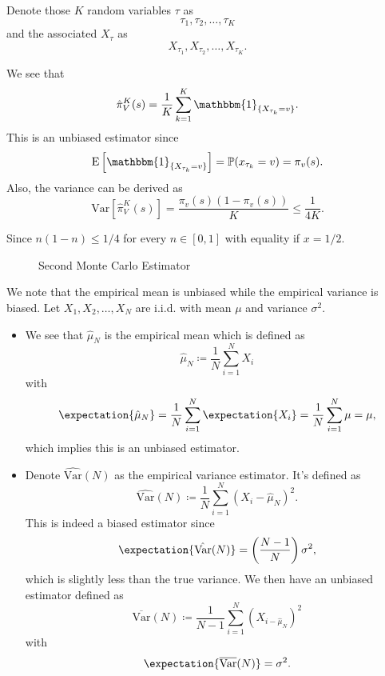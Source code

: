 Denote those \(K\) random variables \(\tau\) as
\[
	\tau_1, \tau_2, \ldots , \tau_K
\]
and the associated \(X_{\tau}\) as
\[
	X_{\tau_1}, X_{\tau_2}, \ldots , X_{\tau_K}.
\]

We see that
\[
	\hat{\pi}_V^K(s) = \frac{1}{K}\sum\limits_{k=1}^{K} \mathbbm{1}_{\{X_{\tau_k} = v\}}.
\]
This is an unbiased estimator since
\[
	\mathrm{E}\left[\mathbbm{1}_{\{X_{\tau_k}=v\}}\right] = \mathbb{\MakeUppercase{P}}(x_{\tau_k} = v) = \pi_v(s).
\]
Also, the variance can be derived as
\[
	\mathrm{Var} \left[ \hat{\pi}_V^K(s) \right] = \frac{\pi_v(s)(1 - \pi_v(s))}{K}\leq \frac{1}{4K}.
\]

\begin{remark}
	Since \(n(1-n)\leq 1/4\) for every \(n\in[0, 1]\) with equality if \(x = 1/2\).
\end{remark}

\begin{figure}[H]
	\centering
	\caption{Second Monte Carlo Estimator}
	\label{fig:Monte-Carlo-Estimator-2}
\end{figure}


\hr

\begin{note}
	We note that the empirical mean is unbiased while the empirical variance is biased. Let \(X_1, X_2, \ldots  ,X_N\) are i.i.d. with mean \(\mu\) and variance \(\sigma^2\).
	\begin{itemize}
		\item We see that \(\hat{\mu}_N\) is the empirical mean which is defined as
		      \[
			      \hat{\mu}_N \coloneqq  \frac{1}{N}\sum\limits_{i=1}^{N} X_i
		      \]
		      with
		      \[
			      \expectation{\hat{\mu}_N} = \frac{1}{N}\sum\limits_{i=1}^{N} \expectation{X_i} = \frac{1}{N}\sum\limits_{i=1}^{N} \mu = \mu,
		      \]
		      which implies this is an unbiased estimator.
		\item Denote \(\hat{\mathrm{Var}}(N)\) as the empirical variance estimator. It's defined as
		      \[
			      \hat{\mathrm{Var}}(N) \coloneqq \frac{1}{N}\sum\limits_{i=1}^{N} (X_i - \hat{\mu}_N)^2.
		      \]
		      This is indeed a biased estimator since
		      \[
			      \expectation{\hat{\mathrm{Var}}(N)} = \left(\frac{N-1}{N}\right) \sigma^2,
		      \]
		      which is slightly less than the true variance. We then have an unbiased estimator defined as
		      \[
			      \overline{\mathrm{Var}}(N) \coloneqq  \frac{1}{N-1}\sum\limits_{i=1}^{N} (X_{i-\hat{\mu}_N})^2
		      \]
		      with
		      \[
			      \expectation{\overline{\mathrm{Var}}(N)} = \sigma^2.
		      \]
	\end{itemize}
\end{note}

